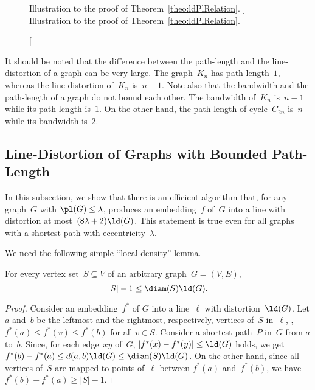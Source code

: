 \begin{figure}
    [htb]
    \centering
    
    \caption
    [%
        Illustration to the proof of Theorem~\ref{theo:ldPlRelation}.
    ]
    {%
        Illustration to the proof of Theorem~\ref{theo:ldPlRelation}.
    }
    \label{fig:ld-vs-pb}
\end{figure}

It should be noted that the difference between the path-length and the line-distortion of a graph can be very large.
The graph~$K_n$ has path-length~$1$, whereas the line-distortion of~$K_n$ is~$n - 1$.
Note also that the bandwidth and the path-length of a graph do not bound each other.
The bandwidth of~$K_n$ is~$n - 1$ while its path-length is~$1$.
On the other hand, the path-length of cycle~$C_{2n}$ is~$n$ while its bandwidth is~$2$.


\subsection{Line-Distortion of Graphs with Bounded Path-Length}
    \label{sec:pb-vs-ld}

In this subsection, we show that there is an efficient algorithm that, for any graph~$G$ with $\pl(G) \leq \lambda$, produces an embedding~$f$ of~$G$ into a line with distortion at most~$(8 \lambda + 2) \ld(G)$.
This statement is true even for all graphs with a shortest path with eccentricity~$\lambda$.

We need the following simple ``local density'' lemma.

\begin{lemma}
    \label{lem:LocalDensity}
For every vertex set~\( S \subseteq V \) of an arbitrary graph~\( G = (V, E) \),
\[
    |S| - 1 \leq \diam(S) \ld(G).
\]
\end{lemma}

\begin{proof}
Consider an embedding~$f^*$ of $G$ into a line~$\ell$ with distortion~$\ld(G)$.
Let $a$ and~$b$ be the leftmost and the rightmost, respectively, vertices of~$S$ in~$\ell$, \ie, $f^*(a) \leq f^*(v) \leq f^*(b)$ for all $v \in S$.
Consider a shortest path~$P$ in~$G$ from $a$ to~$b$.
Since, for each edge~$xy$ of~$G$, $|f^*(x) - f^*(y)| \leq \ld(G)$ holds, we get $f^*(b) - f^*(a) \leq d(a, b) \ld(G) \leq \diam(S) \ld(G)$.
On the other hand, since all vertices of~$S$ are mapped to points of~$\ell$ between $f^*(a)$ and~$f^*(b)$, we have $f^*(b) - f^*(a) \geq |S| - 1$.
\end{proof}

